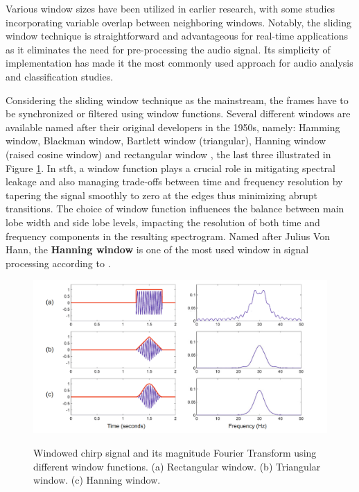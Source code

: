  Various window sizes have been utilized in earlier research, with some studies incorporating variable overlap between neighboring windows. Notably, the sliding window technique is straightforward and advantageous for real-time applications as it eliminates the need for pre-processing the audio signal. Its simplicity of implementation has made it the most commonly used approach for audio analysis and classification studies.

Considering the sliding window technique as the mainstream, the frames have to be synchronized or filtered using window functions. Several different windows are available named after their original developers in the 1950s, namely: Hamming window, Blackman window, Bartlett window (triangular), Hanning window (raised cosine window) and rectangular window \cite{Smith2013}, the last three illustrated in Figure \ref{fig:frmwk_windows_stft_example}. In \gls{stft}, a window function plays a crucial role in mitigating spectral leakage and also managing trade-offs between time and frequency resolution by tapering the signal smoothly to zero at the edges thus minimizing abrupt transitions. The choice of window function influences the balance between main lobe width and side lobe levels, impacting the resolution of both time and frequency components in the resulting spectrogram. Named after Julius Von Hann, the \textbf{Hanning window} is one of the most used window in signal processing according to \textcite{Mueller2021}.

\begin{figure}[htbp]
    \raggedright
        \caption{Windowed chirp signal and its magnitude Fourier Transform using different window functions. (a) Rectangular window. (b) Triangular window. (c) Hanning window.}
        \includegraphics[width=1.0\textwidth]{resources/images/030-theoretical_framework/Framework_windows_stft_examples.png}
        \label{fig:frmwk_windows_stft_example}
\end{figure}

